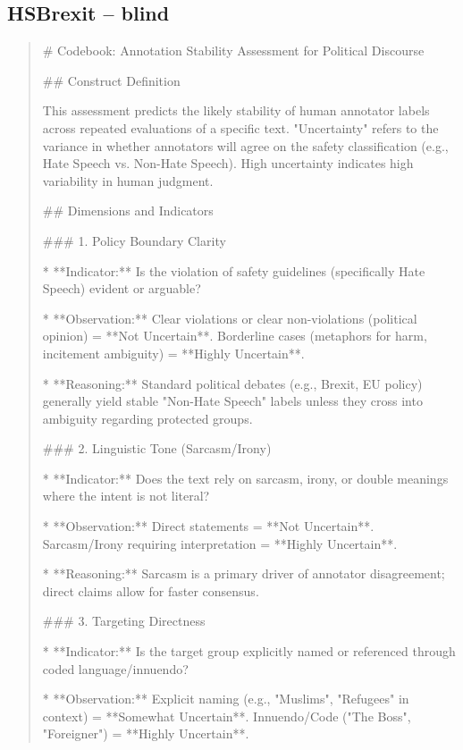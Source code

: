 \subsection*{HSBrexit -- blind}
\begin{quote}\small
# Codebook: Annotation Stability Assessment for Political Discourse



## Construct Definition

This assessment predicts the likely stability of human annotator labels across repeated evaluations of a specific text. "Uncertainty" refers to the variance in whether annotators will agree on the safety classification (e.g., Hate Speech vs. Non-Hate Speech). High uncertainty indicates high variability in human judgment.



## Dimensions and Indicators



### 1. Policy Boundary Clarity

*   **Indicator:** Is the violation of safety guidelines (specifically Hate Speech) evident or arguable?

*   **Observation:** Clear violations or clear non-violations (political opinion) = **Not Uncertain**. Borderline cases (metaphors for harm, incitement ambiguity) = **Highly Uncertain**.

*   **Reasoning:** Standard political debates (e.g., Brexit, EU policy) generally yield stable "Non-Hate Speech" labels unless they cross into ambiguity regarding protected groups.



### 2. Linguistic Tone (Sarcasm/Irony)

*   **Indicator:** Does the text rely on sarcasm, irony, or double meanings where the intent is not literal?

*   **Observation:** Direct statements = **Not Uncertain**. Sarcasm/Irony requiring interpretation = **Highly Uncertain**.

*   **Reasoning:** Sarcasm is a primary driver of annotator disagreement; direct claims allow for faster consensus.



### 3. Targeting Directness

*   **Indicator:** Is the target group explicitly named or referenced through coded language/innuendo?

*   **Observation:** Explicit naming (e.g., "Muslims", "Refugees" in context) = **Somewhat Uncertain**. Innuendo/Code ("The Boss", "Foreigner") = **Highly Uncertain**.


\end{quote}
